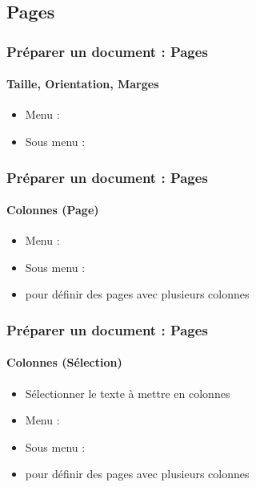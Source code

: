 \documentclass[xcolor=table]{beamer}
\begin{document}
%

\subsection{Pages}

\begin{frame}[t]
\frametitle{Préparer un document : Pages}
\framesubtitle{Taille, Orientation, Marges}

\begin{minipage}{0.38\textwidth}
	\begin{itemize}
		\item Menu :  
		\item Sous menu : 
	\end{itemize}
\end{minipage}
\begin{minipage}{0.6\textwidth}
\end{minipage}

\end{frame}

\begin{frame}[t]
\frametitle{Préparer un document : Pages}
\framesubtitle{Colonnes (Page)}

\begin{minipage}{0.38\textwidth}
	\begin{itemize}
		\item Menu :  
		\item Sous menu : 
		\item pour définir des pages avec plusieurs colonnes
	\end{itemize}
\end{minipage}
\begin{minipage}{0.6\textwidth}
\end{minipage}

\end{frame}

\begin{frame}[t]
\frametitle{Préparer un document : Pages}
\framesubtitle{Colonnes (Sélection)}

\begin{minipage}{0.38\textwidth}
	\begin{itemize}
		\item Sélectionner le texte à mettre en colonnes
		\item Menu :  
		\item Sous menu : 
		\item pour définir des pages avec plusieurs colonnes
	\end{itemize}
\end{minipage}
\begin{minipage}{0.6\textwidth}
\end{minipage}

\end{frame}
\end{document}
